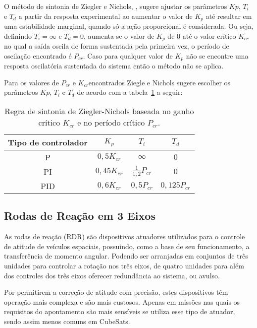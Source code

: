 O método de sintonia  de Ziegler e Nichols, \cite[p.~524]{ogata2011engenharia}, sugere ajustar os parâmetros $Kp$, $T_i$ e $T_d$ a partir da resposta experimental ao aumentar o valor de $K_p$ até resultar em uma estabilidade marginal, quando só a ação proporcional é considerada. Ou seja, definindo $T_i=\infty$ e $T_d=0$, aumenta-se o valor de $K_p$ de 0 até o valor crítico $K_{cr}$no qual a saída oscila de forma sustentada pela primeira vez, o período de oscilação encontrado é $P_{cr}$. Caso para qualquer valor de $K_p$ não se encontre uma resposta oscilatória sustentada do sistema então o método não se aplica.

Para os valores de $P_{cr}$ e $K_{cr}$encontrados Ziegle e Nichols sugere escolher os parâmetros $Kp$, $T_i$ e $T_d$ de acordo com a  tabela~\ref{tab:1} a seguir:

\begin{table}[htpb]
\centering
\caption{Regra de sintonia de Ziegler-Nichols baseada no ganho crítico $K_{cr}$ e no período crítico $P_{cr}$.}\label{tab:1}
\begin{tabular}{|c|c|c|c|}
\hline
\small{Tipo de controlador} & \small{$K_p$} & \small{$T_i$} & \small{$T_d$} \\ \hline
P&$0,5K_{cr}$&$\infty$&$0$\\\hline
PI& $0,45K_{cr}$&$\frac{1}{1,2}P_{cr}$&$0$\\\hline
PID	& $0,6K_{cr}$&$0,5P_{cr}$&$0,125P_{cr}$\\\hline
\end{tabular}
\end{table}


\subsection{Rodas de Reação em 3 Eixos}\label{sec:3.1.6.1}


As rodas de reação (RDR) são dispositivos atuadores utilizados para o controle de atitude de veículos espaciais, possuindo, como a base de seu funcionamento, a transferência de momento angular. Podendo ser arranjadas em conjuntos de três unidades para controlar a rotação nos três eixos, de quatro unidades para além dos controles dos três eixos oferecer redundância ao sistema, ou avulso.

Por permitirem a correção de atitude com precisão, estes dispositivos têm operação mais complexa e são mais custosos. Apenas em missões nas quais os requisitos do apontamento são mais sensíveis se utiliza esse tipo de atuador, sendo assim menos comuns em CubeSats.

